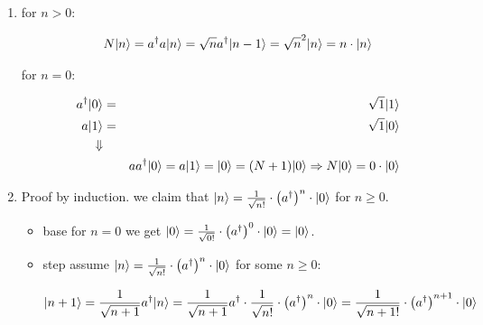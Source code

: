 \documentclass[a4paper,10pt]{hw}
\DeclarePairedDelimiter\ket{\lvert}{\rangle}
\begin{document}
\begin{enumerate}
\item
for $n>0$:

\begin{align*}
N\ket{n} = a^\dagger a \ket{n} =  \sqrt{n} a^\dagger \ket{n-1} = \sqrt{n}^2 \ket{n} = n\cdot \ket{n}
\end{align*}

for $n=0$:

\begin{align*}
a^\dagger \ket{0} &=& \sqrt{1}\ket{1} \\
a \ket{1} &=& \sqrt{1} \ket{0}\\
\Downarrow \\
&& a a^\dagger \ket{0} = a\ket{1} = \ket{0} = (N + 1)\ket{0} \Rightarrow N\ket{0} = 0\cdot\ket{0}
\end{align*}


\item

Proof by induction. we claim that $\ket{n} = \frac{1}{\sqrt{n!}} \cdot \left( a^\dagger \right) ^n \cdot \ket{0}$ for $n \geq 0$.

	\begin{itemize}
	
	\item base
	for $n=0$ we get $\ket{0} = \frac{1}{\sqrt{0!}} \cdot \left( a^\dagger \right)^0 \cdot \ket{0} = \ket{0}$. 
	
	\item step
	assume $\ket{n} = \frac{1}{\sqrt{n!}} \cdot \left( a^\dagger \right) ^n \cdot \ket{0}$ for some $n \geq 0$:
	
	\begin{align*}
	\ket{n+1} &= \frac{1}{\sqrt{n+1}} a^\dagger \ket{n} = \frac{1}{\sqrt{n+1}} a^\dagger\cdot  \frac{1}{\sqrt{n!}} \cdot \left( a^\dagger \right) ^n \cdot \ket{0} = \frac{1}{\sqrt{n+1!}} \cdot \left( a^\dagger \right) ^{n+1} \cdot \ket{0}
	\end{align*}
	
	\end{itemize}

\end{enumerate}
\end{document}
